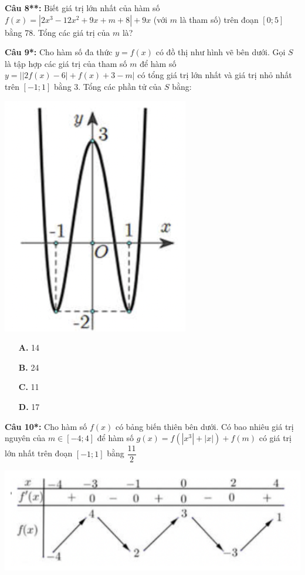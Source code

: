 \documentclass[12pt, a4paper]{article}
\begin{document}
		\textbf{Câu 8**:} Biết giá trị lớn nhất của hàm số $f(x)=\left|2x^3-12x^2+9x+m+8\right| + 9x$ (với $m$ là tham số) trên đoạn $[0;5]$ bằng 78. Tổng các giá trị của $m$ là?
		
		\textbf{Câu 9*: } Cho hàm số đa thức $y=f(x)$ có đồ thị như hình vẽ bên dưới. Gọi $S$ là tập hợp các giá trị của tham số $m$ để hàm số $y=\left| \left|2f(x)-6 \right| +f(x) +3 -m \right|$ có tổng giá trị lớn nhất và giá trị nhỏ nhất trên $[-1;1]$ bằng 3. Tổng các phần tử của $S$ bằng:
			\begin{center}
				\includegraphics[scale=0.87]{../images/max_cau9.png}
			\end{center}
		\begin{multicols}{4}
			\begin{enumerate}
				\item[\textbf{A.}] 14
				\item[\textbf{B.}] 24
				\item[\textbf{C.}] 11
				\item[\textbf{D.}] 17
			\end{enumerate}
		\end{multicols}

		\textbf{Câu 10*: } Cho hàm số $f(x)$ có bảng biến thiên bên dưới. Có bao nhiêu giá trị nguyên của $m \in [-4;4]$ để hàm số $g(x)=f\left(|x^3|+|x|\right) + f(m)$ có giá trị lớn nhất trên đoạn $[-1;1]$ bằng $\dfrac{11}{2}$
			\begin{center}
				\includegraphics[scale=0.8]{../images/max_cau10.png}
			\end{center}
			
\end{document}
